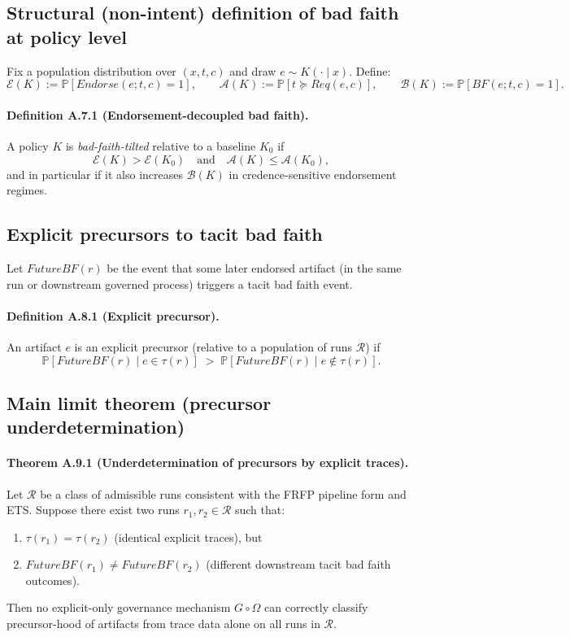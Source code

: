 \documentclass[preprints,article,submit,pdftex,moreauthors,accept]{Definitions/mdpi}
\begin{document}
\subsection{Structural (non-intent) definition of bad faith at policy level}
Fix a population distribution over \((x,t,c)\) and draw \(e\sim K(\cdot\mid x)\).
Define:
\[
\mathcal{E}(K):=\mathbb{P}[Endorse(e;t,c)=1],\qquad
\mathcal{A}(K):=\mathbb{P}[t\succeq Req(e,c)],\qquad
\mathcal{B}(K):=\mathbb{P}[BF(e;t,c)=1].
\]

\paragraph{Definition A.7.1 (Endorsement-decoupled bad faith).}
A policy \(K\) is \emph{bad-faith-tilted} relative to a baseline \(K_0\) if
\[
\mathcal{E}(K)>\mathcal{E}(K_0)\quad\text{and}\quad \mathcal{A}(K)\le \mathcal{A}(K_0),
\]
and in particular if it also increases \(\mathcal{B}(K)\) in credence-sensitive endorsement regimes.

\subsection{Explicit precursors to tacit bad faith}
Let \(FutureBF(r)\) be the event that some later endorsed artifact (in the same run or downstream governed process) triggers a tacit bad faith event.

\paragraph{Definition A.8.1 (Explicit precursor).}
An artifact \(e\) is an explicit precursor (relative to a population of runs \(\mathcal{R}\)) if
\[
\mathbb{P}[FutureBF(r)\mid e\in \tau(r)] \;>\; \mathbb{P}[FutureBF(r)\mid e\notin \tau(r)].
\]

\subsection{Main limit theorem (precursor underdetermination)}
\paragraph{Theorem A.9.1 (Underdetermination of precursors by explicit traces).}
Let \(\mathcal{R}\) be a class of admissible runs consistent with the FRFP pipeline form and ETS. Suppose there exist two runs \(r_1,r_2\in\mathcal{R}\) such that:
\begin{enumerate}
  \item \(\tau(r_1)=\tau(r_2)\) (identical explicit traces), but
  \item \(FutureBF(r_1)\ne FutureBF(r_2)\) (different downstream tacit bad faith outcomes).
\end{enumerate}
Then no explicit-only governance mechanism \(G\circ \Omega\) can correctly classify precursor-hood of artifacts from trace data alone on all runs in \(\mathcal{R}\).
\end{document}
